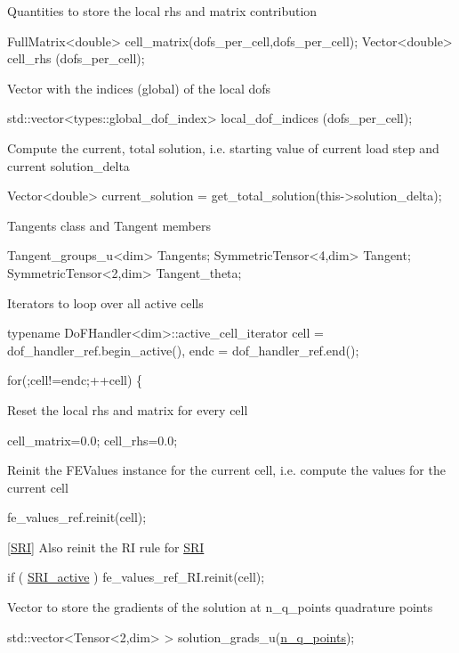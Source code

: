  Quantities to store the local rhs and matrix contribution 
\begin{DoxyCode}
FullMatrix<double> cell\_matrix(dofs\_per\_cell,dofs\_per\_cell);
Vector<double> cell\_rhs (dofs\_per\_cell);
\end{DoxyCode}
 Vector with the indices (global) of the local dofs 
\begin{DoxyCode}
std::vector<types::global\_dof\_index> local\_dof\_indices (dofs\_per\_cell);
\end{DoxyCode}
 Compute the current, total solution, i.\+e. starting value of current load step and current solution\+\_\+delta 
\begin{DoxyCode}
Vector<double> current\_solution = get\_total\_solution(this->solution\_delta);
\end{DoxyCode}
 Tangents class and Tangent members 
\begin{DoxyCode}
Tangent\_groups\_u<dim> Tangents;
SymmetricTensor<4,dim> Tangent;
SymmetricTensor<2,dim> Tangent\_theta;
\end{DoxyCode}
 Iterators to loop over all active cells 
\begin{DoxyCode}
 \textcolor{keyword}{typename} DoFHandler<dim>::active\_cell\_iterator cell = dof\_handler\_ref.begin\_active(),
                                                endc = dof\_handler\_ref.end();

\textcolor{keywordflow}{for}(;cell!=endc;++cell)
\{
\end{DoxyCode}
 Reset the local rhs and matrix for every cell 
\begin{DoxyCode}
cell\_matrix=0.0;
cell\_rhs=0.0;
\end{DoxyCode}
 Reinit the F\+E\+Values instance for the current cell, i.\+e. compute the values for the current cell 
\begin{DoxyCode}
fe\_values\_ref.reinit(cell);
\end{DoxyCode}
 \mbox{[}\hyperlink{namespaceSRI}{S\+RI}\mbox{]} Also reinit the RI rule for \hyperlink{namespaceSRI}{S\+RI} 
\begin{DoxyCode}
\textcolor{keywordflow}{if} ( \hyperlink{assembly__routine__SRI_8cc_a535468030220abae9305a26e9d7f7401}{SRI\_active} )
   fe\_values\_ref\_RI.reinit(cell);
\end{DoxyCode}
 Vector to store the gradients of the solution at n\+\_\+q\+\_\+points quadrature points 
\begin{DoxyCode}
std::vector<Tensor<2,dim> > solution\_grads\_u(\hyperlink{assembly__routine__SRI_8cc_afd52b693751274175b93a58458201e6b}{n\_q\_points});
\end{DoxyCode}
